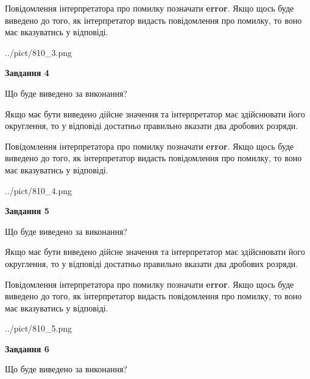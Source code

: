 \documentclass[12pt, ukrainian]{article}
\begin{document}
{\begin {Large}
Повідомлення інтерпретатора про помилку позначати \textbf{error}.
Якщо щось буде виведено до того, як інтерпретатор видасть повідомлення про помилку, 
то воно має вказуватись у відповіді. \par

\begin{center}
	{../pict/810_3.png}
\end{center}
\newpage

{\begin {center}\textbf{Завдання 4}\end {center}}\par
Що буде виведено за виконання? \par

Якщо має бути виведено дійсне значення та інтерпретатор має здійснювати його округлення, 
то у відповіді достатньо правильно вказати два дробових розряди.

Повідомлення інтерпретатора про помилку позначати \textbf{error}.
Якщо щось буде виведено до того, як інтерпретатор видасть повідомлення про помилку, 
то воно має вказуватись у відповіді. \par

\begin{center}
	{../pict/810_4.png}
\end{center}
\newpage

{\begin {center}\textbf{Завдання 5}\end {center}}\par
Що буде виведено за виконання? \par

Якщо має бути виведено дійсне значення та інтерпретатор має здійснювати його округлення, 
то у відповіді достатньо правильно вказати два дробових розряди.

Повідомлення інтерпретатора про помилку позначати \textbf{error}.
Якщо щось буде виведено до того, як інтерпретатор видасть повідомлення про помилку, 
то воно має вказуватись у відповіді. \par

\begin{center}
	{../pict/810_5.png}
\end{center}
\newpage

{\begin {center}\textbf{Завдання 6}\end {center}}\par
Що буде виведено за виконання? \par


\end{Large}}
\end{document}
